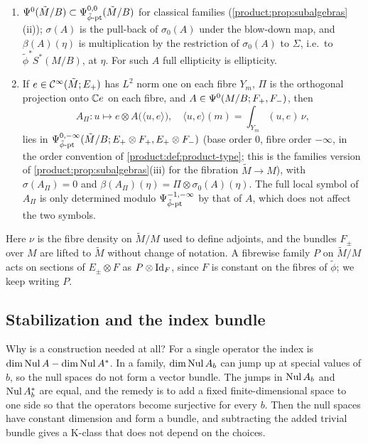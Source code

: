 \begin{enumerate}[label=(P\arabic*)]
  blow-up of the radial projection of the restriction map
  $T^*(\tilde M/B)\to T^*(\tilde M/M)$, which vanishes exactly on
  $\tilde\phi^*T^*(M/B)$. By \cref{blowup:lem:sphere-fibration} (applied fibrewise
  with $W=T^*(\tilde M/B)$, $V=\tilde\phi^*T^*(M/B)$, $W/V=T^*(\tilde M/M)$), $\gamma$ is a
  smooth fibre bundle whose fibres are the radial compactifications of the fibres
  of $\tilde\phi^*T^*(M/B)$.
\item\label{families:P-ordinary} $\Psi^{0}(\tilde M/B)\subset\Psi^{0,0}_{\tilde\phi\text{-}\mathrm{pt}}(\tilde
  M/B)$ for classical families (\cref{product:prop:subalgebras}(ii)); $\sigma(A)$ is the pull-back of $\sigma_0(A)$ under the blow-down map,
  and $\beta(A)(\eta)$ is multiplication by the restriction of $\sigma_0(A)$ to
  $\Sigma$, i.e.\ to $\tilde\phi^*S^*(M/B)$, at $\eta$. For such $A$ full
  ellipticity is ellipticity.
\item\label{families:P-base} If $e\in\mathcal{C}^\infty(\tilde M;E_+)$ has $L^2$ norm one on
  each fibre $Y_m$, $\Pi$ is the orthogonal projection onto $\mathbb{C} e$ on each
  fibre, and $A\in\Psi^{0}(M/B;F_+,F_-)$, then
  \begin{equation*}
    A_\Pi:u\longmapsto e\otimes A\bigl(\langle u,e\rangle\bigr),\quad
    \langle u,e\rangle(m)=\int_{Y_m}(u,e)\,\nu,
  \end{equation*}
  lies in $\Psi^{0,-\infty}_{\tilde\phi\text{-}\mathrm{pt}}(\tilde M/B;E_+\otimes F_+,E_+\otimes F_-)$
  (base order $0$, fibre order $-\infty$, in the order convention of
  \cref{product:def:product-type}; this is the families version of
  \cref{product:prop:subalgebras}(iii) for the fibration $\tilde M\to M$), with
  $\sigma(A_\Pi)=0$ and $\beta(A_\Pi)(\eta)=\Pi\otimes\sigma_0(A)(\eta)$. The
  full local symbol of $A_\Pi$ is only determined modulo
  $\Psi^{-1,-\infty}_{\tilde\phi\text{-}\mathrm{pt}}$ by that of $A$, which does not affect the two
  symbols.
\end{enumerate}
Here $\nu$ is the fibre density on $\tilde M/M$ used to define adjoints, and
the bundles $F_\pm$ over $M$ are lifted to $\tilde M$ without change of
notation. A fibrewise family $P$ on $\tilde M/M$ acts on sections of
$E_\pm\otimes F$ as $P\otimes\operatorname{Id}_F$, since $F$ is constant on the fibres of
$\tilde\phi$; we keep writing $P$.

\subsection{Stabilization and the index bundle}
\begin{discussion}
  Why is a construction needed at all? For a single operator the index is
  $\dim\operatorname{Nul} A-\dim\operatorname{Nul} A^*$. In a family, $\dim\operatorname{Nul} A_b$ can jump up at special
  values of $b$, so the null spaces do not form a vector bundle. The jumps in
  $\operatorname{Nul} A_b$ and $\operatorname{Nul} A_b^*$ are equal, and the remedy is to add a fixed
  finite-dimensional space to one side so that the operators become surjective
  for every $b$. Then the null spaces have constant dimension and form a bundle,
  and subtracting the added trivial bundle gives a K-class that does not depend
  on the choices.
\end{discussion}

